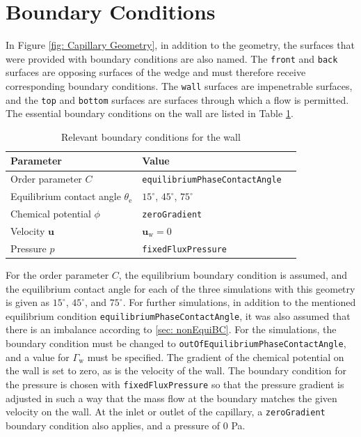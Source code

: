 \section{Boundary Conditions}
In Figure \ref{fig: Capillary Geometry}, in addition to the geometry, the surfaces that were provided with boundary conditions are also named. The \texttt{front} and \texttt{back} surfaces are opposing surfaces of the wedge and must therefore receive corresponding boundary conditions. The \texttt{wall} surfaces are impenetrable surfaces, and the \texttt{top} and \texttt{bottom} surfaces are surfaces through which a flow is permitted.
The essential boundary conditions on the wall are listed in Table \ref{tab: BoundaryConditions_wall}.

\begin{table}[h]
    \centering
    \caption{Relevant boundary conditions for the wall}
    \label{tab: BoundaryConditions_wall}
    \begin{tabular}{lll}
        Parameter & Value \\ \hline
        Order parameter $C$ & \texttt{equilibriumPhaseContactAngle} \\
        Equilibrium contact angle $\theta_{\mathrm{e}}$ & $15^{\circ}$, $45^{\circ}$, $75^{\circ}$ \\
        Chemical potential $\phi$ & \texttt{zeroGradient} \\
        Velocity $\mathbf{u}$ & $\mathbf{u_{\mathrm{w}}} = 0$ \\
        Pressure $p$ & \texttt{fixedFluxPressure} \\
    \end{tabular}
\end{table}
For the order parameter $C$, the equilibrium boundary condition is assumed, and the equilibrium contact angle for each of the three simulations with this geometry is given as $15^{\circ}$, $45^{\circ}$, and $75^{\circ}$. For further simulations, in addition to the mentioned equilibrium condition \verb|equilibriumPhaseContactAngle|, it was also assumed that there is an imbalance according to \ref{sec: nonEquiBC}. For the simulations, the boundary condition must be changed to \verb|outOfEquilibriumPhaseContactAngle|, and a value for $\Gamma_{\mathrm{w}}$ must be specified.
The gradient of the chemical potential on the wall is set to zero, as is the velocity of the wall. The boundary condition for the pressure is chosen with \verb|fixedFluxPressure| so that the pressure gradient is adjusted in such a way that the mass flow at the boundary matches the given velocity on the wall.
At the inlet or outlet of the capillary, a \verb|zeroGradient| boundary condition also applies, and a pressure of $0$ Pa.

